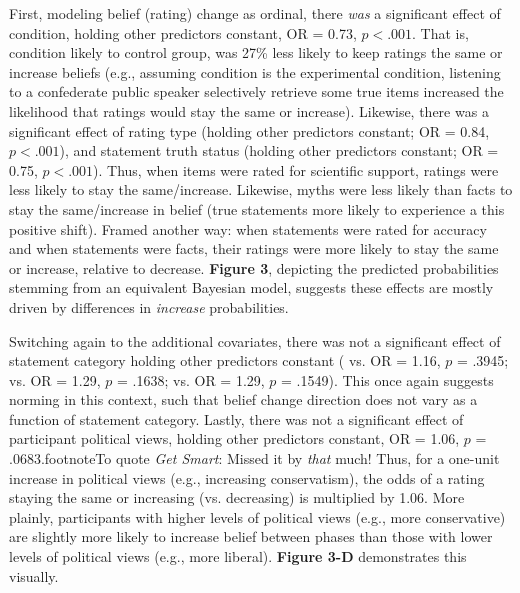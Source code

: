 \documentclass[12pt]{article}  %
\begin{document}
First, modeling belief (rating) change as ordinal, there \textit{was} a significant effect of condition, holding other predictors constant, OR = 0.73, $p < .001$. That is, condition  likely to control group, was 27\% less likely to keep ratings the same or increase beliefs (e.g., assuming condition  is the experimental condition, listening to a confederate public speaker selectively retrieve some true items increased the likelihood that ratings would stay the same or increase). Likewise, there was a significant effect of rating type (holding other predictors constant; OR = 0.84, $p < .001$), and statement truth status (holding other predictors constant; OR = 0.75, $p < .001$). Thus, when items were rated for scientific support, ratings were less likely to stay the same/increase. Likewise, myths were less likely than facts to stay the same/increase in belief (true statements more likely to experience a this positive shift). Framed another way: when statements were rated for accuracy and when statements were facts, their ratings were more likely to stay the same or increase, relative to decrease. \textbf{Figure 3}, depicting the predicted probabilities stemming from an equivalent Bayesian model, suggests these effects are mostly driven by differences in \textit{increase} probabilities.

Switching again to the additional covariates, there was not a significant effect of statement category holding other predictors constant ( vs.  OR = 1.16, $p$ = .3945;  vs.  OR = 1.29, $p$ = .1638;  vs.  OR = 1.29, $p$ = .1549). This once again suggests norming  in this context, such that belief change direction does not vary as a function of statement category. Lastly, there was not a significant effect of participant political views, holding other predictors constant, OR = 1.06, $p$ = .0683.footnote{To quote \textit{Get Smart}: Missed it by \textit{that} much!} Thus, for a one-unit increase in political views (e.g., increasing conservatism), the odds of a rating staying the same or increasing (vs. decreasing) is multiplied by 1.06. More plainly, participants with higher levels of political views (e.g., more conservative) are slightly more likely to increase belief between phases than those with lower levels of political views (e.g., more liberal). \textbf{Figure 3-D} demonstrates this visually.


\newpage
\end{document}
